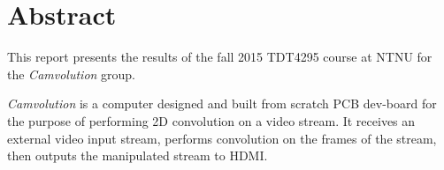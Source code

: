 \chapter*{Abstract}
This report presents the results of the fall 2015 TDT4295 course at NTNU for the \textit{Camvolution} group.

\textit{Camvolution} is a computer designed and built from scratch PCB dev-board for the purpose of performing 2D convolution on a video stream.
It receives an external video input stream,
performs convolution on the frames of the stream,
then outputs the manipulated stream to HDMI.
